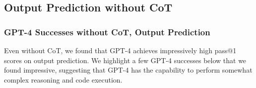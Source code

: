 

\subsection{Output Prediction without CoT}

\subsubsection{GPT-4 Successes without CoT, Output Prediction}
Even without CoT, we found that GPT-4 achieves impressively high pass@1 scores on output prediction. We highlight a few GPT-4 successes below that we found impressive, suggesting that GPT-4 has the capability to perform somewhat complex reasoning and code execution. 

